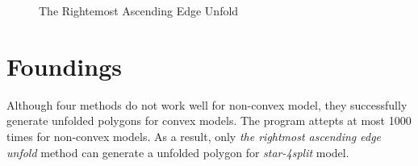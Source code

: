 \documentclass[11pt, letterpaper]{article}
\begin{document}
\begin{figure}[h]
\centering
{}
\hspace{5mm}
\hspace{5mm}
\hspace{5mm}
\hspace{5mm}
\caption{The Rightemost Ascending Edge Unfold}
\end{figure}








\clearpage
\section{Foundings}
Although four methods do not work well for non-convex model, they successfully generate unfolded polygons for convex models. The program attepts at most 1000 times for non-convex models. As a result, only \textit{the rightmost ascending edge unfold} method can generate a unfolded polygon for \textit{star-4split} model.
\end{document}
